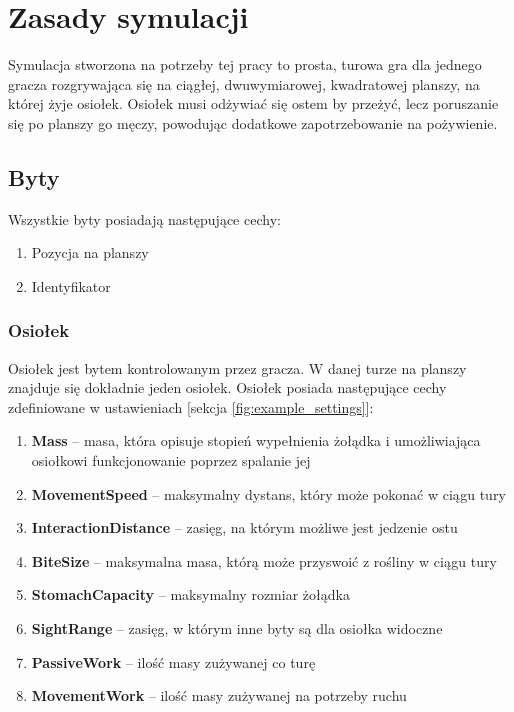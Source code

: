 \chapter{Zasady symulacji}
Symulacja stworzona na potrzeby tej pracy to prosta, turowa gra dla jednego gracza rozgrywająca się na ciągłej, dwuwymiarowej, kwadratowej planszy, na której żyje osiołek. Osiołek musi odżywiać się ostem by przeżyć, lecz poruszanie się po planszy go męczy, powodując dodatkowe zapotrzebowanie na pożywienie.

\section{Byty}
Wszystkie byty posiadają następujące cechy:
\begin{enumerate}    
    \item Pozycja na planszy
    \item Identyfikator
\end{enumerate}

\subsection{Osiołek}
Osiołek jest bytem kontrolowanym przez gracza. W danej turze na planszy znajduje się dokładnie jeden osiołek. Osiołek posiada następujące cechy zdefiniowane w ustawieniach [sekcja \ref{fig:example_settings}]:
\begin{enumerate}    
    \item \textbf{Mass} -- masa, która opisuje stopień wypełnienia żołądka i umożliwiająca osiołkowi funkcjonowanie poprzez spalanie jej
    \item \textbf{MovementSpeed} -- maksymalny dystans, który może pokonać w ciągu tury
    \item \textbf{InteractionDistance} -- zasięg, na którym możliwe jest jedzenie ostu
    \item \textbf{BiteSize} -- maksymalna masa, którą może przyswoić z rośliny w ciągu tury
    \item \textbf{StomachCapacity} -- maksymalny rozmiar żołądka
    \item \textbf{SightRange} -- zasięg, w którym inne byty są dla osiołka widoczne
    \item \textbf{PassiveWork} -- ilość masy zużywanej co turę
    \item \textbf{MovementWork} -- ilość masy zużywanej na potrzeby ruchu 
\end{enumerate}

